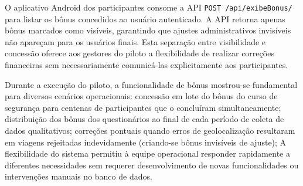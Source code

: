 O aplicativo Android dos participantes
consome a API \texttt{POST /api/exibeBonus/} para listar os bônus concedidos ao
usuário autenticado. A API retorna apenas bônus marcados como visíveis, garantindo que ajustes administrativos invisíveis não
apareçam para os usuários finais. Esta separação entre visibilidade e concessão
oferece aos gestores do piloto a flexibilidade de realizar correções financeiras
sem necessariamente comunicá-las explicitamente aos participantes.

Durante a execução do piloto, a
funcionalidade de bônus mostrou-se fundamental para diversos cenários operacionais:
concessão em lote do bônus do curso de segurança para centenas de participantes que
o concluíram simultaneamente; distribuição dos bônus dos questionários ao final de
cada período de coleta de dados qualitativos; correções pontuais quando erros de
geolocalização resultaram em viagens rejeitadas indevidamente (criando-se bônus
invisíveis de ajuste); A flexibilidade do sistema permitiu à
equipe operacional responder rapidamente a diferentes necessidades sem requerer
desenvolvimento de novas funcionalidades ou intervenções manuais no banco de dados.



